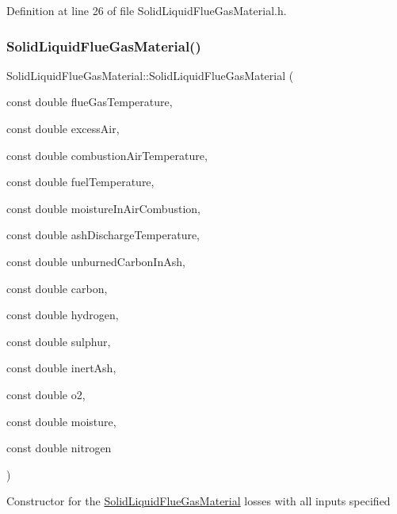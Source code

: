 Definition at line 26 of file Solid\+Liquid\+Flue\+Gas\+Material.\+h.

\mbox{\label{class_solid_liquid_flue_gas_material_a91e7c5e670b3db4fedcbc494448644d5}} 
\subsubsection{\texorpdfstring{Solid\+Liquid\+Flue\+Gas\+Material()}{SolidLiquidFlueGasMaterial()}\hspace{0.1cm}{\footnotesize\ttfamily [3/3]}}
{\footnotesize\ttfamily Solid\+Liquid\+Flue\+Gas\+Material\+::\+Solid\+Liquid\+Flue\+Gas\+Material (\begin{DoxyParamCaption}\item[{const double}]{flue\+Gas\+Temperature,  }\item[{const double}]{excess\+Air,  }\item[{const double}]{combustion\+Air\+Temperature,  }\item[{const double}]{fuel\+Temperature,  }\item[{const double}]{moisture\+In\+Air\+Combustion,  }\item[{const double}]{ash\+Discharge\+Temperature,  }\item[{const double}]{unburned\+Carbon\+In\+Ash,  }\item[{const double}]{carbon,  }\item[{const double}]{hydrogen,  }\item[{const double}]{sulphur,  }\item[{const double}]{inert\+Ash,  }\item[{const double}]{o2,  }\item[{const double}]{moisture,  }\item[{const double}]{nitrogen }\end{DoxyParamCaption})\hspace{0.3cm}{\ttfamily [inline]}}

Constructor for the \hyperlink{class_solid_liquid_flue_gas_material}{Solid\+Liquid\+Flue\+Gas\+Material} losses with all inputs specified


